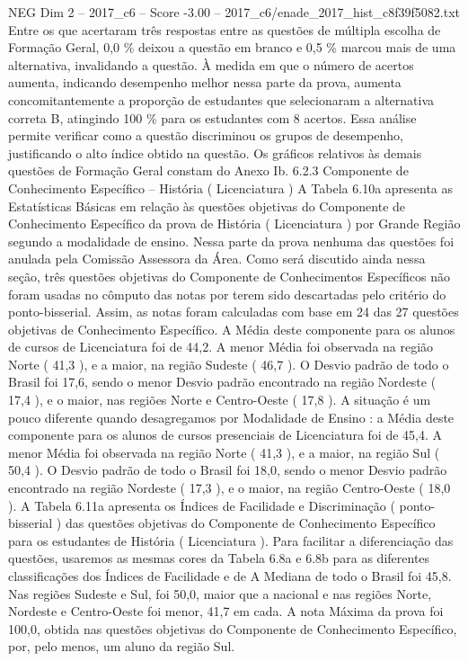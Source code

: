 \begin{textsample}{NEG Dim 2 – 2017\_c6 – Score -3.00 – 2017\_c6/enade\_2017\_hist\_c8f39f5082.txt}
Entre os que acertaram três respostas entre as questões de múltipla escolha de Formação Geral, 0,0 \% deixou a questão em branco e 0,5 \% marcou mais de uma alternativa, invalidando a questão.
À medida em que o número de acertos aumenta, indicando desempenho melhor nessa parte da prova, aumenta concomitantemente a proporção de estudantes que selecionaram a alternativa correta B, atingindo 100 \% para os estudantes com 8 acertos.
Essa análise permite verificar como a questão discriminou os grupos de desempenho, justificando o alto índice obtido na questão.
Os gráficos relativos às demais questões de Formação Geral constam do Anexo Ib. 6.2.3 Componente de Conhecimento Específico – História ( Licenciatura ) A Tabela 6.10a apresenta as Estatísticas Básicas em relação às questões objetivas do Componente de Conhecimento Específico da prova de História ( Licenciatura ) por Grande Região segundo a modalidade de ensino.
Nessa parte da prova nenhuma das questões foi anulada pela Comissão Assessora da Área.
Como será discutido ainda nessa seção, três questões objetivas do Componente de Conhecimentos Específicos não foram usadas no cômputo das notas por terem sido descartadas pelo critério do ponto-bisserial.
Assim, as notas foram calculadas com base em 24 das 27 questões objetivas de Conhecimento Específico.
A Média deste componente para os alunos de cursos de Licenciatura foi de 44,2.
A menor Média foi observada na região Norte ( 41,3 ), e a maior, na região Sudeste ( 46,7 ).
O Desvio padrão de todo o Brasil foi 17,6, sendo o menor Desvio padrão encontrado na região Nordeste ( 17,4 ), e o maior, nas regiões Norte e Centro-Oeste ( 17,8 ).
A situação é um pouco diferente quando desagregamos por Modalidade de Ensino : a Média deste componente para os alunos de cursos presenciais de Licenciatura foi de 45,4.
A menor Média foi observada na região Norte ( 41,3 ), e a maior, na região Sul ( 50,4 ).
O Desvio padrão de todo o Brasil foi 18,0, sendo o menor Desvio padrão encontrado na região Nordeste ( 17,3 ), e o maior, na região Centro-Oeste ( 18,0 ).
A Tabela 6.11a apresenta os Índices de Facilidade e Discriminação ( ponto-bisserial ) das questões objetivas do Componente de Conhecimento Específico para os estudantes de História ( Licenciatura ).
Para facilitar a diferenciação das questões, usaremos as mesmas cores da Tabela 6.8a e 6.8b para as diferentes classificações dos Índices de Facilidade e de A Mediana de todo o Brasil foi 45,8.
Nas regiões Sudeste e Sul, foi 50,0, maior que a nacional e nas regiões Norte, Nordeste e Centro-Oeste foi menor, 41,7 em cada.
A nota Máxima da prova foi 100,0, obtida nas questões objetivas do Componente de Conhecimento Específico, por, pelo menos, um aluno da região Sul.

\end{textsample}

